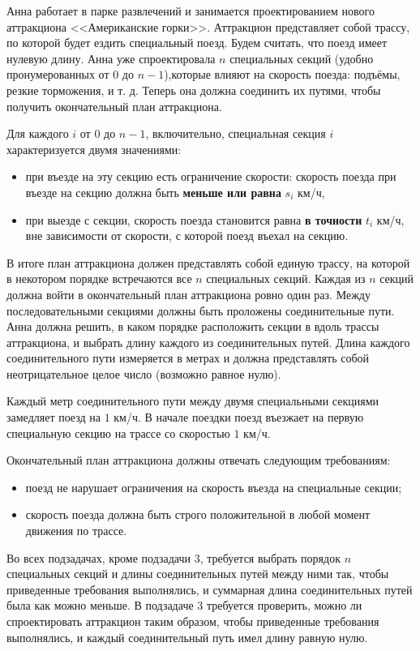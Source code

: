 Анна работает в парке развлечений и занимается проектированием нового аттракциона <<Американские горки>>. Аттракцион представляет собой трассу, по которой будет ездить специальный поезд. Будем считать, что поезд имеет нулевую длину. Анна уже спроектировала $n$ специальных секций (удобно пронумерованных от $0$ до $n - 1$),которые влияют на скорость поезда: подъёмы, резкие торможения, и т. д. Теперь она должна соединить их путями, чтобы получить окончательный план аттракциона.

Для каждого $i$ от $0$ до $n - 1$, включительно, специальная секция $i$
характеризуется двумя значениями:
\begin{itemize}
\item при въезде на эту секцию есть ограничение скорости: скорость поезда при въезде на секцию должна быть \textbf{меньше или равна} $s_i$ км/ч,
\item при выезде с секции, скорость поезда становится равна \textbf{в точности} $t_i$ км/ч, вне зависимости от скорости, с которой поезд въехал на секцию.
\end{itemize}

В итоге план аттракциона должен представлять собой единую трассу, на которой в некотором порядке встречаются все $n$ специальных секций. Каждая
из $n$ секций должна войти в окончательный план аттракциона ровно один раз.
Между последовательными секциями должны быть проложены соединительные пути. Анна должна решить, в каком порядке расположить секции в вдоль трассы аттракциона, и выбрать длину каждого из соединительных путей. Длина каждого соединительного пути измеряется в метрах и должна представлять собой неотрицательное целое число (возможно равное нулю).

Каждый метр соединительного пути между двумя специальными секциями замедляет поезд на $1$ км/ч. В начале поездки поезд въезжает на первую специальную секцию на трассе со скоростью $1$ км/ч.

Окончательный план аттракциона должны отвечать следующим требованиям: 
\begin{itemize}
\item поезд не нарушает ограничения на скорость въезда на специальные секции;
\item скорость поезда должна быть строго положительной в любой момент движения по трассе.
\end{itemize}

Во всех подзадачах, кроме подзадачи 3, требуется выбрать порядок $n$ специальных секций и длины соединительных путей между ними так, чтобы приведенные требования выполнялись, и суммарная длина соединительных путей была как можно меньше. В подзадаче 3 требуется проверить, можно ли спроектировать аттракцион таким образом, чтобы приведенные требования выполнялись, и каждый соединительный путь имел длину равную нулю.

